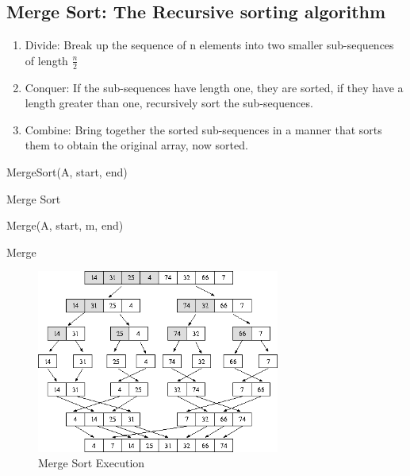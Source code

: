 \documentclass[12pt,letterpaper]{article}
\begin{document}
\subsection{Merge Sort: The Recursive sorting algorithm}
\begin{enumerate}
\item Divide: Break up the sequence of n elements into two smaller sub-sequences of length $\frac{n}{2}$
\item Conquer: If the sub-sequences have length one, they are sorted, if they have a length greater than one, recursively sort the sub-sequences.
\item Combine: Bring together the sorted sub-sequences in a manner that sorts them to obtain the original array, now sorted.
\end{enumerate}
\begin{algorithm}
MergeSort(A, start, end)
\caption{Merge Sort}
\label{Merge Sort}
\end{algorithm}
\begin{algorithm}[H]
Merge(A, start, m, end)
\caption{Merge}
\label{Merge}
\end{algorithm}
\pagebreak

\begin{figure}[h]
\centering
\includegraphics[width=8cm]{mergesort}
\caption{Merge Sort Execution}
\end{figure}
\end{document}
